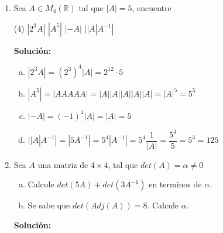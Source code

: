 \documentclass[12pt]{article}
\newenvironment{solucion}
{\begin{mdframed}[backgroundcolor=black!10]
		{\bf Solución:}\\
	}
	{
	\end{mdframed}
}
\newenvironment{preguntas}
{\begin{enumerate}\itemsep12pt
	}
	{
	\end{enumerate}
}
\newcommand{\ra}{\rightarrow}
\newcommand{\R}{\mathbb{R}}
\begin{document}
\begin{preguntas}
\begin{solucion}
$$\begin{pmatrix}
		\end{pmatrix}$$
		Digamos ahora que
		$$Px = z \ra L^Tz = y \ra \begin{bmatrix}
		1 & -1 & 0\\
		0 & 1 & 1\\
		0 & 0 & 1
		\end{bmatrix}z = \begin{pmatrix}
		0 \\ 0 \\ -1
		\end{pmatrix} \ra z = \begin{pmatrix}
		1 \\ 1 \\ -1
		\end{pmatrix}$$
		Por último
		$$Px = z \ra \begin{bmatrix}
		2 & 1 & 0\\
		0 & 1 & 1\\
		0 & 0 & -1
		\end{bmatrix}x = \begin{pmatrix}
		1 \\ 1 \\ -1
		\end{pmatrix} \ra x = \begin{pmatrix}
		-1 \\ 1 \\ 1
		\end{pmatrix}$$
		En conclusión, la tercera fila de $A^{-1}$ es $\begin{pmatrix}
		-1 \\ 1 \\ 1
		\end{pmatrix}$
\end{solucion}
\item Sea $A \in M_4 (\R)$ tal que $|A|=5$, encuentre
\begin{tasks}(4)
\task $|2^3A|$
\task $|A^5|$
\task $|-A|$
\task $||A|A^{-1}|$
\end{tasks}
\begin{solucion}

\begin{enumerate}[a)]
\item $|2^3A| = (2^3)^4|A| = 2^{12}\cdot 5$
\item $|A^5| = |AAAAA| = |A||A||A||A||A| = |A|^5 = 5^5$
\item $|-A| = (-1)^4|A| = |A| = 5$
\item $||A|A^{-1}| = |5A^{-1}| = 5^4|A^{-1}| = 5^4\dfrac{1}{|A|} = \dfrac{5^4}{5} = 5^3 = 125$
\end{enumerate}
\end{solucion}
\item Sea $A$ una matriz de $4\times 4$, tal que $det(A) = \alpha \neq 0$
\begin{enumerate}[a)]
\item Calcule  $det(5A)+det(3A^{-1})$ en terminos de $\alpha$.
\item Se sabe que $det(Adj(A))=8$. Calcule $\alpha$.
\end{enumerate}
\begin{solucion}


\end{solucion}
\end{preguntas}
\end{document}
